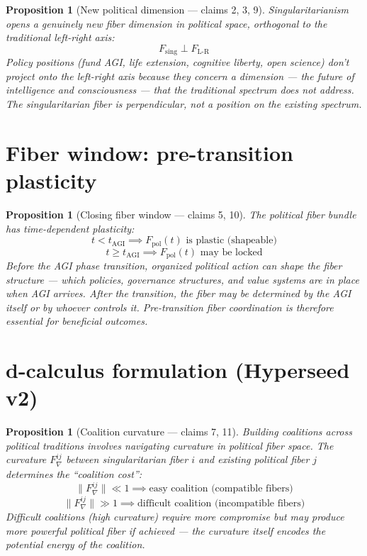 \documentclass[11pt,a4paper]{article}
\newtheorem{proposition}[definition]{Proposition}
\begin{document}
\begin{proposition}[New political dimension --- claims 2, 3, 9]
\label{prop:orthogonal}
Singularitarianism opens a genuinely new fiber dimension in political
space, orthogonal to the traditional left-right axis:
\[
  F_{\text{sing}} \perp F_{\text{L-R}}
\]
Policy positions (fund AGI, life extension, cognitive liberty, open science)
don't project onto the left-right axis because they concern a dimension ---
the future of intelligence and consciousness --- that the traditional
spectrum does not address. The singularitarian fiber is \emph{perpendicular},
not a position on the existing spectrum.
\end{proposition}

\section{Fiber window: pre-transition plasticity}

\begin{proposition}[Closing fiber window --- claims 5, 10]
\label{prop:window}
The political fiber bundle has time-dependent plasticity:
\[
  t < t_{\text{AGI}} \implies F_{\text{pol}}(t) \text{ is plastic (shapeable)}
\]
\[
  t \geq t_{\text{AGI}} \implies F_{\text{pol}}(t) \text{ may be locked}
\]
Before the AGI phase transition, organized political action can shape the
fiber structure --- which policies, governance structures, and value systems
are in place when AGI arrives. After the transition, the fiber may be
determined by the AGI itself or by whoever controls it. Pre-transition
fiber coordination is therefore essential for beneficial outcomes.
\end{proposition}

\section{d-calculus formulation (Hyperseed v2)}

\begin{proposition}[Coalition curvature --- claims 7, 11]
\label{prop:coalition}
Building coalitions across political traditions involves navigating
curvature in political fiber space. The curvature $F_\nabla^{ij}$
between singularitarian fiber $i$ and existing political fiber $j$
determines the ``coalition cost'':
\[
  \|F_\nabla^{ij}\| \ll 1 \implies \text{easy coalition (compatible fibers)}
\]
\[
  \|F_\nabla^{ij}\| \gg 1 \implies \text{difficult coalition (incompatible fibers)}
\]
Difficult coalitions (high curvature) require more compromise but may
produce more powerful political fiber if achieved --- the curvature
itself encodes the potential energy of the coalition.
\end{proposition}
\end{document}

